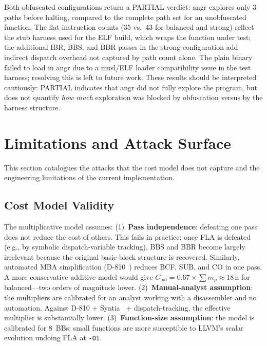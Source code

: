 \documentclass[conference]{IEEEtran}
\begin{document}
Both obfuscated configurations return a PARTIAL verdict: angr explores
only 3 paths before halting, compared to the complete path set for an
unobfuscated function.
The flat instruction counts (35 vs.\ 43 for balanced and strong) reflect
the stub harness used for the ELF build, which wraps the function under
test; the additional IBR, BBS, and BBR passes in the strong configuration
add indirect dispatch overhead not captured by path count alone.
The plain binary failed to load in angr due to a musl/ELF loader
compatibility issue in the test harness; resolving this is left to
future work.
These results should be interpreted cautiously: PARTIAL indicates that
angr did not fully explore the program, but does not quantify \emph{how
much} exploration was blocked by obfuscation versus by the harness
structure.

\section{Limitations and Attack Surface}
\label{sec:limits}

This section catalogues the attacks that the cost model does not
capture and the engineering limitations of the current implementation.

\subsection{Cost Model Validity}

The multiplicative model assumes:
(1)~\textbf{Pass independence}: defeating one pass does not reduce the
cost of others.
This fails in practice: once FLA is defeated (e.g., by symbolic
dispatch-variable tracking), BBS and BBR become largely irrelevant
because the original basic-block structure is recovered.
Similarly, automated MBA simplification (D-810~\cite{liu2017d810})
reduces BCF, SUB, and CO in one pass.
A more conservative additive model would give
$C_{\text{bal}} = 0.67 \times \sum m_p \approx 18\,\text{h}$ for
balanced---two orders of magnitude lower.
(2)~\textbf{Manual-analyst assumption}: the multipliers are calibrated
for an analyst working with a disassembler and no automation.
Against D-810 + Syntia~\cite{blazytko2017syntia} + dispatch-tracking,
the effective multiplier is substantially lower.
(3)~\textbf{Function-size assumption}: the model is calibrated for
8~BBs; small functions are more susceptible to LLVM's scalar
evolution undoing FLA at \texttt{-O1}.
\end{document}
